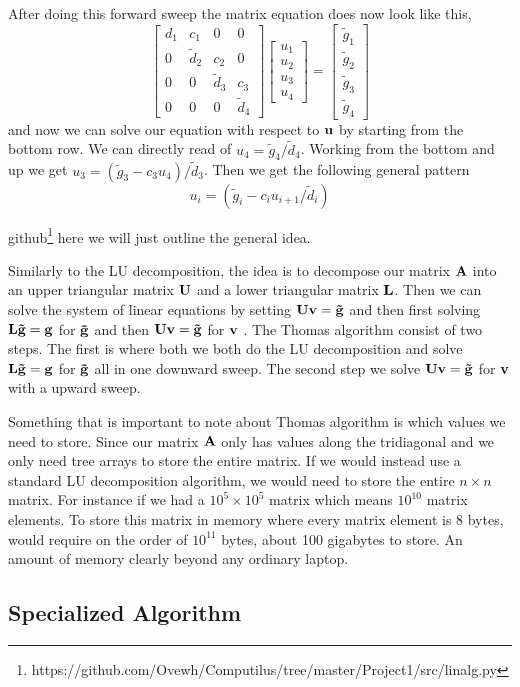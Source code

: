 After doing this forward sweep the matrix equation does now look like this,
\begin{equation*}
  \begin{bmatrix}
    d_1 & c_1 & 0 & 0 \\
    0 & \tilde{d}_2 & c_2 & 0 \\
    0 & 0 & \tilde{d}_3 & c_3  \\
    0 & 0 & 0 & \tilde{d}_4 
  \end{bmatrix} \begin{bmatrix}
    u_1 \\ u_2 \\ u_3 \\ u_4
  \end{bmatrix} = \begin{bmatrix}
    \tilde{g}_1 \\ \tilde{g}_2 \\ \tilde{g}_3 \\ \tilde{g}_4
  \end{bmatrix}
\end{equation*}
and now we can solve our equation with respect to $\mathbf{u}$ by starting from
the bottom row. We can directly read of $u_4 = \tilde{g}_4 / \tilde{d}_4$.
Working from the bottom and up we get $u_3 = \left(\tilde{g}_3-c_3
u_4\right)/\tilde{d}_3$. Then we get the following general pattern
\begin{equation}
  u_i = \left(\tilde{g}_i - c_i u_{i+1}/\tilde{d}_i \right)
\end{equation}  

github\footnote{https://github.com/Ovewh/Computilus/tree/master/Project1/src/linalg.py}
here we will just outline the general idea. \par Similarly to the LU
decomposition, the idea is to decompose our matrix $\mathbf{A}$ into an upper
triangular matrix $\mathbf{U}$ and a lower triangular matrix $\mathbf{L}$. Then we
can solve the system of linear equations by setting $\mathbf{U}\mathbf{v}=
\mathbf{\tilde{g}}$ and then first solving 
$\mathbf{L} \mathbf{\tilde{g}} = \mathbf{g}$ for $\mathbf{\tilde{g}}$ and then 
$\mathbf{U}\mathbf{v} = \mathbf{\tilde{g}}$ for $\mathbf{v}$
\cite{tridia}. The Thomas algorithm consist of two steps. The first is where
both we both do the LU decomposition and solve $\mathbf{L} \mathbf{\tilde{g}} =
\mathbf{g}$ for $\mathbf{\tilde{g}}$ all in one downward sweep. The second step we
solve $\mathbf{U}\mathbf{v} = \mathbf{\tilde{g}}$ for $\mathbf{v}$ with a upward sweep. 

Something that is important to note about Thomas algorithm is which
values we need to store. Since our matrix $\mathbf{A}$ only has values along
the tridiagonal and we only need tree arrays to store the entire matrix. If we
would instead use a standard LU decomposition algorithm, we would need to store
the entire $n \times n$ matrix. For instance if we had a $10^5 \times 10^5$   
matrix which means $10^10$ matrix elements. To store this matrix in memory where
every matrix element is 8 bytes, would require on the order of $10^{11}$ bytes, 
about 100 gigabytes to store. An amount of memory clearly beyond any
ordinary laptop. 

\subsection*{Specialized Algorithm}
